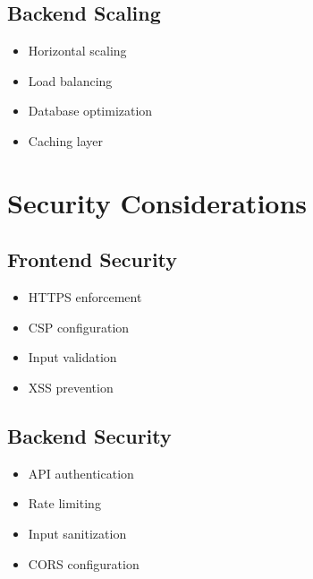 \subsection{Backend Scaling}
\begin{itemize}
    \item Horizontal scaling
    \item Load balancing
    \item Database optimization
    \item Caching layer
\end{itemize}

\section{Security Considerations}
\subsection{Frontend Security}
\begin{itemize}
    \item HTTPS enforcement
    \item CSP configuration
    \item Input validation
    \item XSS prevention
\end{itemize}

\subsection{Backend Security}
\begin{itemize}
    \item API authentication
    \item Rate limiting
    \item Input sanitization
    \item CORS configuration
\end{itemize}
